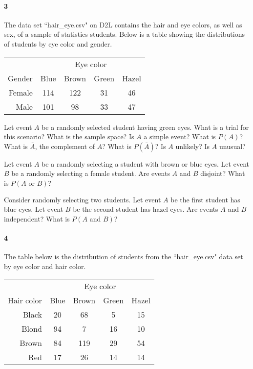 \documentclass{article}
\begin{document}
\begin{flushleft}
\begin{enumalpha}
\end{enumalpha}

\newpage
\paragraph{3} The data set ``hair\_eye.csv" on D2L contains the hair and eye colors, as well as sex, of a sample of statistics students. Below is a table showing the distributions of students by eye color and gender.\\
\medskip
\renewcommand{\arraystretch}{1}
{\centering
\begin{tabular}{ r| c c c c}
& \multicolumn{4}{c}{Eye color}\\
Gender & Blue & Brown & Green & Hazel\\
\hline
 Female &  114   &  122  &  31  &  46\\
 Male   & 101  &  98  &  33  &  47
\end{tabular}
\par}
\begin{enumalpha}
\item Let event $A$ be a randomly selected student having green eyes. What is a trial for this scenario? What is the sample space? Is $A$ a simple event? What is $P(A)$? What is $\bar A$, the complement of $A$? What is $P(\bar A)$? Is $A$ unlikely? Is $A$ unusual?
\vspace{2.25in}
\item Let event $A$ be a randomly selecting a student with brown or blue eyes. Let event $B$ be a randomly selecting a female student. Are events $A$ and $B$ disjoint? What is $P(A \text{ or } B)$?
\vspace{2.25in}
\item Consider randomly selecting two students. Let event $A$ be the first student has blue eyes. Let event $B$ be the second student has hazel eyes. Are events $A$ and $B$ independent? What is $P(A \text { and } B)$?

\end{enumalpha}

\newpage
\paragraph{4} The table below is the distribution of students from the ``hair\_eye.csv" data set by eye color and hair color.\\
\medskip
\renewcommand{\arraystretch}{1}
{\centering
\begin{tabular}{ r| c c c c}
& \multicolumn{4}{c}{Eye color}\\
Hair color & Blue & Brown & Green & Hazel\\
\hline
  Black &  20  &  68  &   5  &  15\\
 Blond  & 94   &  7  &  16  &  10\\
 Brown &  84  & 119  &  29  &  54\\
 Red   &  17  &  26  &  14  &  14
\end{tabular}
\par}


\end{flushleft}
\end{document}
